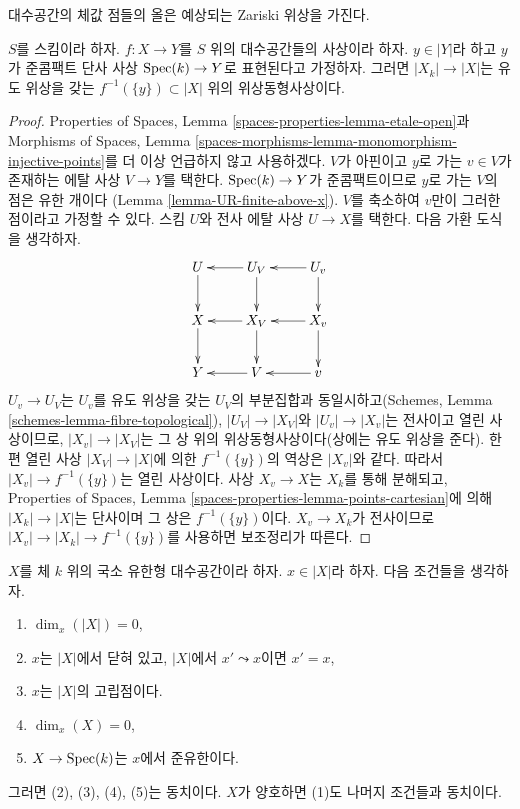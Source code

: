 \begin{lemma}
\label{lemma-topology-fibre}
\begin{slogan}
대수공간의 체값 점들의 올은 예상되는 Zariski 위상을 가진다.
\end{slogan}
$S$를 스킴이라 하자. $f : X \to Y$를 $S$ 위의 대수공간들의
사상이라 하자. $y \in |Y|$라 하고 $y$가 준콤팩트 단사 사상
$\mathop{\mathrm{Spec}}(k) \to Y$로 표현된다고 가정하자. 그러면
$|X_k| \to |X|$는 유도 위상을 갖는
$f^{-1}(\{y\}) \subset |X|$ 위의 위상동형사상이다.
\end{lemma}

\begin{proof}
Properties of Spaces, Lemma \ref{spaces-properties-lemma-etale-open}과
Morphisms of Spaces, Lemma
\ref{spaces-morphisms-lemma-monomorphism-injective-points}를 더 이상
언급하지 않고 사용하겠다. $V$가 아핀이고 $y$로 가는
$v \in V$가 존재하는 에탈 사상 $V \to Y$를 택한다.
$\mathop{\mathrm{Spec}}(k) \to Y$가 준콤팩트이므로 $y$로 가는 $V$의 점은 유한 개이다
(Lemma \ref{lemma-UR-finite-above-x}). $V$를 축소하여 $v$만이
그러한 점이라고 가정할 수 있다. 스킴 $U$와 전사 에탈 사상
$U \to X$를 택한다. 다음 가환 도식을 생각하자.
$$
\xymatrix{
U \ar[d] & U_V \ar[l] \ar[d] & U_v \ar[l] \ar[d] \\
X \ar[d] & X_V \ar[l] \ar[d] & X_v \ar[l] \ar[d] \\
Y & V \ar[l] & v \ar[l]
}
$$
$U_v \to U_V$는 $U_v$를 유도 위상을 갖는 $U_V$의 부분집합과
동일시하고(Schemes, Lemma \ref{schemes-lemma-fibre-topological}),
$|U_V| \to |X_V|$와 $|U_v| \to |X_v|$는 전사이고 열린 사상이므로,
$|X_v| \to |X_V|$는 그 상 위의 위상동형사상이다(상에는 유도 위상을
준다). 한편 열린 사상 $|X_V| \to |X|$에 의한
$f^{-1}(\{y\})$의 역상은 $|X_v|$와 같다. 따라서
$|X_v| \to f^{-1}(\{y\})$는 열린 사상이다.
사상 $X_v \to X$는 $X_k$를 통해 분해되고, Properties of Spaces,
Lemma \ref{spaces-properties-lemma-points-cartesian}에 의해
$|X_k| \to |X|$는 단사이며 그 상은 $f^{-1}(\{y\})$이다.
$X_v \to X_k$가 전사이므로
$|X_v| \to |X_k| \to f^{-1}(\{y\})$를 사용하면 보조정리가 따른다.
\end{proof}

\begin{lemma}
\label{lemma-conditions-on-point-on-space-over-field}
$X$를 체 $k$ 위의 국소 유한형 대수공간이라 하자. $x \in |X|$라
하자. 다음 조건들을 생각하자.
\begin{enumerate}
\item $\dim_x(|X|) = 0$,
\item $x$는 $|X|$에서 닫혀 있고, $|X|$에서 $x' \leadsto x$이면
$x' = x$,
\item $x$는 $|X|$의 고립점이다.
\item $\dim_x(X) = 0$,
\item $X \to \mathop{\mathrm{Spec}}(k)$는 $x$에서 준유한이다.
\end{enumerate}
그러면 (2), (3), (4), (5)는 동치이다.
$X$가 양호하면 (1)도 나머지 조건들과 동치이다.
\end{lemma}


